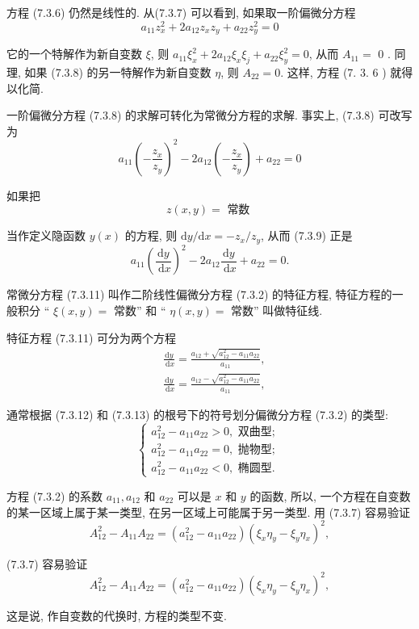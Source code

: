 方程 (7.3.6) 仍然是线性的.
从(7.3.7) 可以看到, 如果取一阶偏微分方程
$$
a_{11} z_x^2+2 a_{12} z_x z_y+a_{22} z_y^2=0
$$

它的一个特解作为新自变数 $\xi$, 则 $a_{11} \xi_x^2+2 a_{12} \xi_x \xi_j+a_{22} \xi_y^2=0$, 从而 $A_{11}=$ 0 . 同理, 如果 (7.3.8) 的另一特解作为新自变数 $\eta$, 则 $A_{22}=0$. 这样, 方程 (7. 3. 6 ) 就得以化简.

一阶偏微分方程 (7.3.8) 的求解可转化为常微分方程的求解. 事实上, (7.3.8) 可改写为
$$
a_{11}\left(-\frac{z_x}{z_y}\right)^2-2 a_{12}\left(-\frac{z_x}{z_y}\right)+a_{22}=0
$$

如果把
$$
z(x, y)=\text { 常数 }
$$

当作定义隐函数 $y(x)$ 的方程, 则 $\mathrm{d} y / \mathrm{d} x=-z_x / z_y$, 从而 (7.3.9) 正是
$$
a_{11}\left(\frac{\mathrm{d} y}{\mathrm{~d} x}\right)^2-2 a_{12} 
\frac{\mathrm{d} y}{\mathrm{~d} x}+a_{22}=0 .
$$

常微分方程 (7.3.11) 叫作二阶线性偏微分方程 (7.3.2) 的特征方程, 
特征方程的一般积分 “ $\xi(x, y)=$ 常数” 和 “ $\eta(x, y)=$ 常数” 叫做特征线.

特征方程 (7.3.11) 可分为两个方程
$$
\begin{aligned}
& \frac{\mathrm{d} y}{\mathrm{~d} x}=\frac{a_{12}+\sqrt{a_{12}^2-a_{11} a_{22}}}{a_{11}}, \\
& \frac{\mathrm{d} y}{\mathrm{~d} x}=\frac{a_{12}-\sqrt{a_{12}^2-a_{11} a_{22}}}{a_{11}},
\end{aligned}
$$

通常根据 (7.3.12) 和 (7.3.13) 的根号下的符号划分偏微分方程 (7.3.2) 的类型:
$$
\left\{\begin{array}{l}
a_{12}^2-a_{11} a_{22}>0, \text { 双曲型; } \\
a_{12}^2-a_{11} a_{22}=0, \text { 抛物型; } \\
a_{12}^2-a_{11} a_{22}<0, \text { 椭圆型. }
\end{array}\right.
$$

方程 (7.3.2) 的系数 $a_{11}, a_{12}$ 和 $a_{22}$ 可以是 $x$ 和 $y$ 的函数, 所以, 一个方程在自变数的某一区域上属于某一类型, 在另一区域上可能属于另一类型. 用 (7.3.7) 容易验证
$$
A_{12}^2-A_{11} A_{22}=\left(a_{12}^2-a_{11} a_{22}\right)\left(\xi_x \eta_y-\xi_y \eta_x\right)^2,
$$

(7.3.7) 容易验证
$$
A_{12}^2-A_{11} A_{22}=\left(a_{12}^2-a_{11} a_{22}\right)\left(\xi_x \eta_y-\xi_y \eta_x\right)^2,
$$

这是说, 作自变数的代换时, 方程的类型不变.


